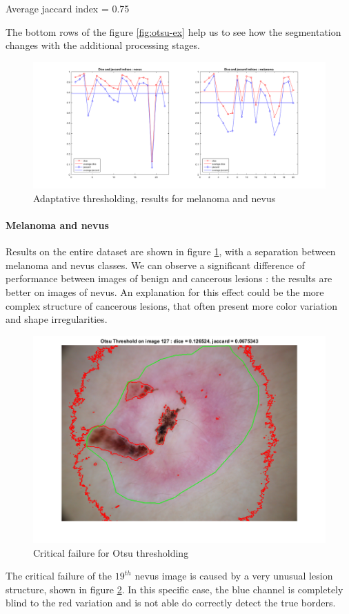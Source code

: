 \documentclass[a4paper,10pt]{article}
\begin{document}
Average jaccard index = 0.75

The bottom rows of the figure \ref{fig:otsu-ex} help us to see how the segmentation changes with the additional processing stages. 

\begin{figure}[h]
	\centering
	\includegraphics[width=0.9\linewidth]{../results/otsu/melaVSnev}
	\caption{Adaptative thresholding, results for melanoma and nevus}
	\label{fig:otsu-melaVSnev}
\end{figure}

\paragraph{Melanoma and nevus} 
Results on the entire dataset are shown in figure \ref{fig:otsu-melaVSnev}, with a separation between melanoma and nevus classes. We can observe a significant difference of performance between images of benign and cancerous lesions : the results are better on images of nevus. An explanation for this effect could be the more complex structure of cancerous lesions, that often present more color variation and shape irregularities. 
\begin{figure}[h]
	\centering
	\includegraphics[width=0.40\linewidth]{../results/otsu/otsu-127}
	\caption{Critical failure for Otsu thresholding}
	\label{fig:otsu-127}
\end{figure}

The critical failure of the $19^{th}$ nevus image is caused by a very unusual lesion structure, shown in figure \ref{fig:otsu-127}. In this specific case, the blue channel is completely blind to the red variation and is not able do correctly detect the true borders.
\end{document}
